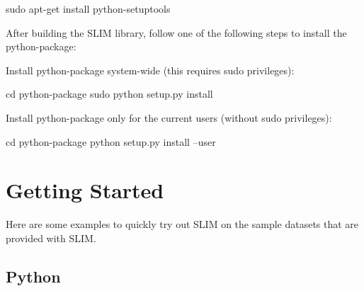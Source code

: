 \begin{DoxyVerb}sudo apt-get install python-setuptools
\end{DoxyVerb}


After building the S\+L\+IM library, follow one of the following steps to install the python-\/package\+:


\begin{DoxyEnumerate}
\item Install python-\/package system-\/wide (this requires sudo privileges)\+: \begin{DoxyVerb}cd python-package
sudo python setup.py install
\end{DoxyVerb}

\item Install python-\/package only for the current users (without sudo privileges)\+: \begin{DoxyVerb}cd python-package
python setup.py install --user
\end{DoxyVerb}

\end{DoxyEnumerate}\hypertarget{index_getting_started}{}\section{Getting Started}\label{index_getting_started}
Here are some examples to quickly try out S\+L\+IM on the sample datasets that are provided with S\+L\+IM.\hypertarget{index_python_getting_started}{}\subsection{Python}\label{index_python_getting_started}

